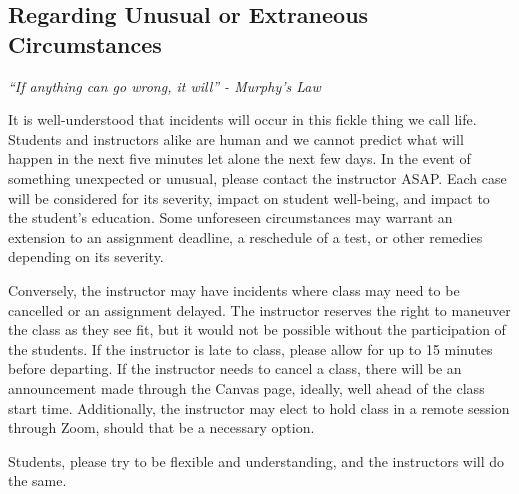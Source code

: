     \subsection*{Regarding Unusual or Extraneous Circumstances}
    \emph{``If anything can go wrong, it will'' - Murphy's Law}

    It is well-understood that incidents will occur in this fickle thing we call life.
    Students and instructors alike are human and we cannot predict what will happen in the next five minutes let alone the next few days.
    In the event of something unexpected or unusual, please contact the instructor ASAP.
    Each case will be considered for its severity, impact on student well-being, and impact to the student's education.
    Some unforeseen circumstances may warrant an extension to an assignment deadline, a reschedule of a test, or other remedies depending on its severity.
    
    Conversely, the instructor may have incidents where class may need to be cancelled or an assignment delayed. The instructor reserves the right to maneuver the class as they see fit, but it would not be possible without the participation of the students.
    If the instructor is late to class, please allow for up to 15 minutes before departing.
    If the instructor needs to cancel a class, there will be an announcement made through the Canvas page, ideally, well ahead of the class start time.
    Additionally, the instructor may elect to hold class in a remote session through Zoom, should that be a necessary option.
    
    Students, please try to be flexible and understanding, and the instructors will do the same.

